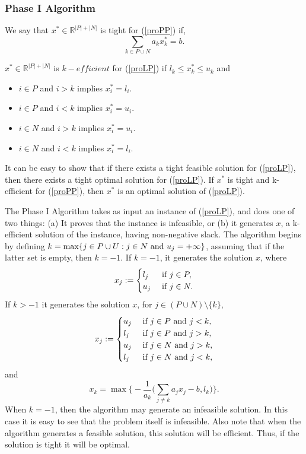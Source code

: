 \documentclass[a4paper,11pt]{article}
\begin{document}
\subsubsection{Phase I Algorithm}
\begin{definition}
We say that $x^*\in\mathbb R^{|P|+|N|}$ is tight for (\ref{proPP}) if,
\begin{equation}
\sum_{k\in P\cup N} a_kx^*_k=b.
\end{equation}
\end{definition}
\begin{definition}
$x^*\in\mathbb R^{|P|+|N|}$ is $k-efficient$ for  (\ref{proLP}) if $l_k\leq x^*_k\leq u_k$ and 
\begin{itemize}
\item  $i\in P$ and $i>k$ implies $x_i^*=l_i$.
\item  $i\in P$ and $i<k$ implies $x_i^*=u_i$.
\item  $i\in N$ and $i>k$ implies $x_i^*=u_i$.
\item  $i\in N$ and $i<k$ implies $x_i^*=l_i$.
\end{itemize}
\end{definition}
It can be easy to show that if there exists a tight feasible solution for (\ref{proLP}), then there exists a
tight optimal solution for  (\ref{proLP}). If $x^*$ is tight and k-efficient for (\ref{proPP}), then $x^*$ is an optimal solution of (\ref{proLP}).

The Phase I Algorithm takes as input an instance of (\ref{proLP}), and does one of two things: (a) It proves that the instance is infeasible, or (b) it generates $x$, a k-efficient solution of the instance, having non-negative slack. The algorithm begins by defining $k=\max\{j\in P\cup U: j\in N ~\mbox{and}~ u_j=+\infty \}$, assuming that if the latter set is empty, then $k =-1$. If $k = -1$, it generates the solution $x$, where
\begin{equation}
x_j := \begin{cases}
l_j &~\mbox{if}~ j\in P,\\
u_j &~\mbox{if}~ j \in N.
\end{cases}
\end{equation}
If $k > −1$ it generates the solution $x$, for $j\in(P\cup N)\setminus \{k\}$,
\begin{equation}
x_j := \begin{cases}
u_j &~\mbox{if}~ j\in P ~\mbox{and}~ j<k,\\
l_j &~\mbox{if}~ j \in P  ~\mbox{and}~ j>k,\\
u_j &~\mbox{if}~ j\in N ~\mbox{and}~ j>k,\\
l_j &~\mbox{if}~ j \in N  ~\mbox{and}~ j<k,\\
\end{cases}
\end{equation}
and
$$x_k = \max\Big\{-\frac{1}{a_k}\Big(\sum_{j\neq k} a_jx_j-b, l_k \Big)\Big\}.$$
When $k=-1$, then the algorithm may generate an infeasible solution. In this case it is easy to see that the problem itself is infeasible. Also note that when the algorithm generates a feasible solution, this solution will be efficient. Thus, if the solution is tight it will be optimal. 
\end{document}
